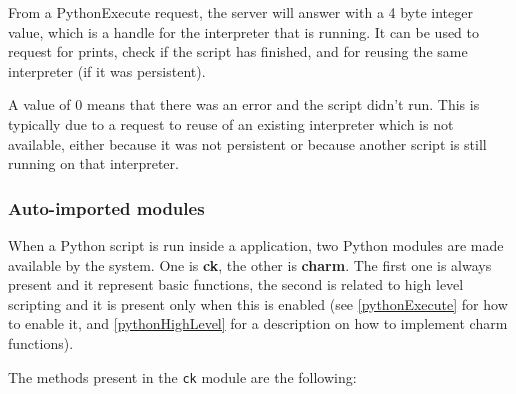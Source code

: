From a PythonExecute request, the server will answer with a 4 byte integer
value, which is a handle for the interpreter that is running. It can be used to
request for prints, check if the script has finished, and for reusing the same
interpreter (if it was persistent).

A value of 0 means that there was an error and the script didn't run. This is
typically due to a request to reuse of an existing interpreter which is not
available, either because it was not persistent or because another script is
still running on that interpreter.


\subsubsection{Auto-imported modules}

\label{pythonModules}

When a Python script is run inside a \charmpp{} application, two Python modules
are made available by the system. One is \textbf{ck}, the other is
\textbf{charm}. The first one is always present and it represent basic
functions, the second is related to high level scripting and it is present only
when this is enabled (see \ref{pythonExecute} for how to enable it, and
\ref{pythonHighLevel} for a description on how to implement charm functions).

The methods present in the \texttt{ck} module are the following:

